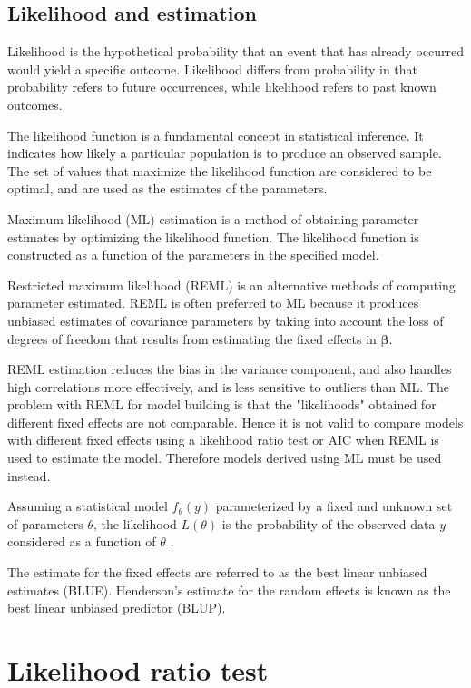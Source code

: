 \documentclass[MAIN.tex]{subfiles}
\begin{document}
\subsection*{Likelihood and estimation}

Likelihood is the hypothetical probability that an event that has already occurred would yield a specific outcome. Likelihood differs from probability in that probability refers to future occurrences, while likelihood refers to past known outcomes.

The likelihood function is a fundamental concept in statistical inference. It indicates how likely a particular population is to
produce an observed sample. The set of values that maximize the likelihood function are considered to be optimal, and are used as
the estimates of the parameters.

Maximum likelihood (ML) estimation is a method of obtaining parameter estimates by optimizing the likelihood function. The
likelihood function is constructed as a function of the parameters in the specified model.

Restricted maximum likelihood (REML) is an alternative methods of computing parameter estimated. REML is often preferred to ML
because it produces unbiased estimates of covariance parameters by taking into account the loss of degrees of freedom that results
from estimating the fixed effects in $\boldsymbol{\beta}$.

REML estimation reduces the bias in the variance component, and also handles high correlations
more effectively, and is less sensitive to outliers than ML.  The problem with REML for model building is that the "likelihoods" obtained for different fixed effects are not comparable. Hence it is not valid to compare models
with different fixed effects using a likelihood ratio test or AIC when REML is used to
estimate the model. Therefore models derived using ML must be used instead.

\bigskip


Assuming a statistical model $f_{\theta}(y)$ parameterized by a fixed and unknown set of parameters $\theta$, the likelihood $L(\theta)$ is the probability of the observed data $y$ considered as a function of $\theta$ \citep{youngjo}.

The estimate for the fixed effects are referred to as the best linear unbiased estimates (BLUE). Henderson's estimate for the random effects is known as the best linear unbiased predictor (BLUP).

\section{Likelihood ratio test}
\end{document}
